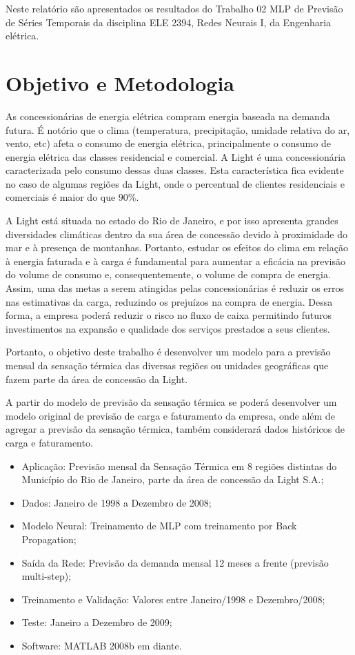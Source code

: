\documentclass[journal, a4paper]{IEEEtran}
\begin{document}
	Neste relatório são apresentados os resultados do Trabalho 02 MLP de Previsão de Séries Temporais da disciplina ELE 2394, Redes Neurais I, da Engenharia elétrica.
	

\section{Objetivo e Metodologia}


As concessionárias de energia elétrica compram energia baseada na demanda futura. É notório que o clima (temperatura, precipitação, umidade relativa do ar, vento, etc) afeta o consumo de energia elétrica, principalmente o consumo de energia elétrica das classes residencial e comercial. A Light é uma concessionária caracterizada pelo consumo dessas duas classes. Esta característica fica evidente no caso de algumas regiões da Light, onde o percentual de clientes residenciais e comerciais é maior do que $90\%$.

A Light está situada no estado do Rio de Janeiro, e por isso apresenta grandes diversidades
climáticas dentro da sua área de concessão devido à proximidade do mar e à presença de montanhas. Portanto, estudar os efeitos do clima em relação à energia faturada e à carga é
fundamental para aumentar a eficácia na previsão do volume de consumo e, consequentemente, o
volume de compra de energia. Assim, uma das metas a serem atingidas pelas concessionárias é reduzir os erros nas estimativas da carga, reduzindo os prejuízos na compra de energia. Dessa forma, a empresa poderá reduzir o risco no fluxo de caixa permitindo futuros investimentos na expansão e qualidade dos serviços prestados a seus clientes.

Portanto, o objetivo deste trabalho é desenvolver um modelo para a previsão mensal da sensação
térmica das diversas regiões ou unidades geográficas que fazem parte da área de concessão da
Light.

A partir do modelo de previsão da sensação térmica se poderá desenvolver um modelo original de
previsão de carga e faturamento da empresa, onde além de agregar a previsão da sensação térmica, também considerará dados históricos de carga e faturamento.\\


\begin{itemize}[\textbf{Detalhamento}]
	 \item{Aplicação:} Previsão mensal da Sensação Térmica em 8 regiões distintas do
	 Município do Rio de Janeiro, parte da área de concessão da Light S.A.;
     \item{Dados:} Janeiro de 1998 a Dezembro de 2008;
     \item{Modelo Neural:} Treinamento de MLP com treinamento por Back Propagation;
     \item{Saída da Rede:} Previsão da demanda mensal 12 meses a frente (previsão multi-step);
     \item{Treinamento e Validação:} Valores entre Janeiro/1998 e Dezembro/2008;
     \item{Teste:} Janeiro a Dezembro de 2009;
     \item{Software:} MATLAB 2008b em diante.
\end{itemize}
\end{document}
